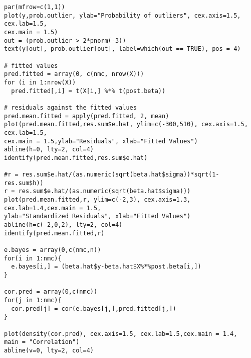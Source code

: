 \documentclass[a4paper, 11pt]{article}
\begin{document}
\begin{verbatim}
par(mfrow=c(1,1))
plot(y,prob.outlier, ylab="Probability of outliers", cex.axis=1.5, cex.lab=1.5,
cex.main = 1.5)
out = (prob.outlier > 2*pnorm(-3))
text(y[out], prob.outlier[out], label=which(out == TRUE), pos = 4)

# fitted values
pred.fitted = array(0, c(nmc, nrow(X)))
for (i in 1:nrow(X))
  pred.fitted[,i] = t(X[i,] %*% t(post.beta))

# residuals against the fitted values  
pred.mean.fitted = apply(pred.fitted, 2, mean)
plot(pred.mean.fitted,res.sum$e.hat, ylim=c(-300,510), cex.axis=1.5, cex.lab=1.5,
cex.main = 1.5,ylab="Residuals", xlab="Fitted Values")
abline(h=0, lty=2, col=4)
identify(pred.mean.fitted,res.sum$e.hat)

#r = res.sum$e.hat/(as.numeric(sqrt(beta.hat$sigma))*sqrt(1-res.sum$h))
r = res.sum$e.hat/(as.numeric(sqrt(beta.hat$sigma)))
plot(pred.mean.fitted,r, ylim=c(-2,3), cex.axis=1.3, cex.lab=1.4,cex.main = 1.5,
ylab="Standardized Residuals", xlab="Fitted Values")
abline(h=c(-2,0,2), lty=2, col=4)
identify(pred.mean.fitted,r)

e.bayes = array(0,c(nmc,n))
for(i in 1:nmc){
  e.bayes[i,] = (beta.hat$y-beta.hat$X%*%post.beta[i,])
}

cor.pred = array(0,c(nmc))
for(j in 1:nmc){
  cor.pred[j] = cor(e.bayes[j,],pred.fitted[j,])
}

plot(density(cor.pred), cex.axis=1.5, cex.lab=1.5,cex.main = 1.4, 
main = "Correlation")
abline(v=0, lty=2, col=4)

\end{verbatim}
\end{document}
